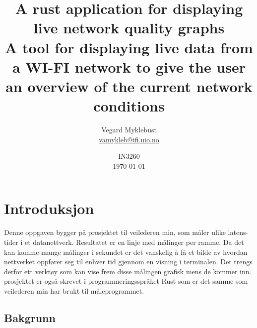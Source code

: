 \documentclass[norsk]{uiobachelorthesis}
\title{A rust application for displaying live network quality graphs\\[1ex]
  \large A tool for displaying live data from a WI-FI network to give the user an overview of the current network conditions}
\author{Vegard Myklebust\\ \url{vamykleb@ifi.uio.no}}
\date{IN3260 \\ \today}
\begin{document}
\maketitle

\begin{abstract}
\end{abstract}

\tableofcontents
\newpage

\section{Introduksjon}
\label{sec:introduksjon}
Denne oppgaven bygger på prosjektet til veilederen min, som måler ulike latens-tider i et datanettverk. Resultatet er en linje med målinger per ramme. Da det kan komme mange målinger i sekundet er det vanskelig å få et bilde av hvordan nettverket oppfører seg til enhver tid gjennom en visning i terminalen. Det trengs derfor ett verktøy som kan vise frem disse målingen grafisk mens de kommer inn. prosjektet er også skrevet  i programmeringsspråket Rust som er det samme som veilederen min har brukt til måleprogrammet. 

\subsection{Bakgrunn}
\label{sec:bakgrunn}
\end{document}

